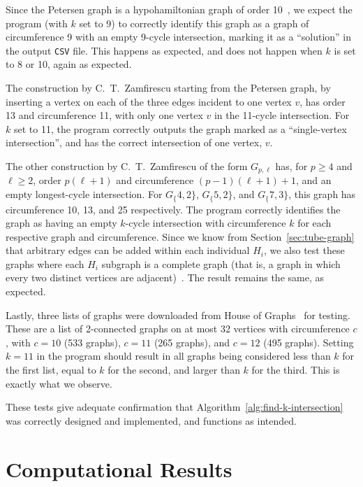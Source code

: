 Since the Petersen graph is a hypohamiltonian graph of order 10~\cite{article:van-aardt}, we expect the program (with $k$ set to 9) to correctly identify this graph as a graph of circumference 9 with an empty 9-cycle intersection, marking it as a ``solution'' in the output \texttt{CSV} file. This happens as expected, and does not happen when $k$ is set to 8 or 10, again as expected.

The construction by C.\ T.\ Zamfirescu starting from the Petersen graph, by inserting a vertex on each of the three edges incident to one vertex $v$, has order 13 and circumference 11, with only one vertex $v$ in the 11-cycle intersection. For $k$ set to 11, the program correctly outputs the graph marked as a ``single-vertex intersection'', and has the correct intersection of one vertex, $v$.

The other construction by C.\ T.\ Zamfirescu of the form $G_{p,\ell}$ has, for $p\ge4$ and $\ell\ge2$, order $p(\ell+1)$ and circumference $(p-1)(\ell+1)+1$, and an empty longest-cycle intersection. For $G_\{4,2\}$, $G_\{5,2\}$, and $G_\{7,3\}$, this graph has circumference 10, 13, and 25 respectively. The program correctly identifies the graph as having an empty $k$-cycle intersection with circumference $k$ for each respective graph and circumference. Since we know from Section~\ref{sec:tube-graph} that arbitrary edges can be added within each individual $H_i$, we also test these graphs where each $H_i$ subgraph is a complete graph (that is, a graph in which every two distinct vertices are adjacent)~\cite{book:bondy-definitions}. The result remains the same, as expected.

Lastly, three lists of graphs were downloaded from House of Graphs~\cite{data:houseofgraphs} for testing. These are a list of 2-connected graphs on at most 32 vertices with circumference $c$, with $c=10$ (533 graphs), $c=11$ (265 graphs), and $c=12$ (495 graphs). Setting $k=11$ in the program should result in all graphs being considered less than $k$ for the first list, equal to $k$ for the second, and larger than $k$ for the third. This is exactly what we observe.

These tests give adequate confirmation that Algorithm~\ref{alg:find-k-intersection} was correctly designed and implemented, and functions as intended.

\section{Computational Results}

